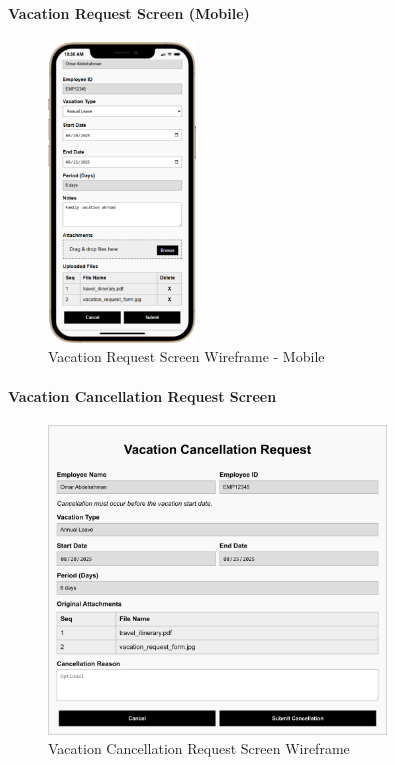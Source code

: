\documentclass[12pt,a4paper]{article}
\begin{document}
\paragraph{Vacation Request Screen (Mobile)}
\begin{figure}[H]
\centering
\includegraphics[width=0.35\textwidth]{Wireframes/Vacation-Request/Vacation-Request-Mobile.png}
\caption{Vacation Request Screen Wireframe - Mobile}
\label{fig:wireframe-vacation-request-mobile}
\end{figure}

\paragraph{Vacation Cancellation Request Screen}
\begin{figure}[H]
\centering
\includegraphics[width=0.8\textwidth]{Wireframes/Vacation-Cancellation-Request/Vacation-Cancellation-Request-1.png}
\caption{Vacation Cancellation Request Screen Wireframe}
\label{fig:wireframe-vacation-cancellation}
\end{figure}
\end{document}

